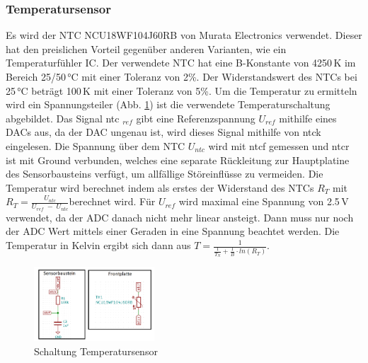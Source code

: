 \subsubsection{Temperatursensor}
Es wird der NTC NCU18WF104J60RB von Murata Electronics verwendet. Dieser hat den preislichen Vorteil gegenüber anderen Varianten, wie ein Temperaturfühler IC. Der verwendete NTC hat eine B-Konstante von 4250\,K im Bereich 25/50\,°C mit einer Toleranz von 2\%. Der Widerstandswert des NTCs bei 25\,°C beträgt 100\,K mit einer Toleranz von 5\%. Um die Temperatur zu ermitteln wird ein Spannungsteiler (Abb. \ref{pic: Temperatursensor}) ist die verwendete Temperaturschaltung abgebildet. Das Signal ntc $_{ref}$ gibt eine Referenzspannung $U_{ref}$ mithilfe eines DACs aus, da der DAC ungenau ist, wird dieses Signal mithilfe von ntck eingelesen. Die Spannung über dem NTC $U_{ntc}$ wird mit ntcf gemessen und ntcr ist mit Ground verbunden, welches eine separate Rückleitung zur Hauptplatine des Sensorbausteins verfügt, um allfällige Störeinflüsse zu vermeiden. Die Temperatur wird berechnet indem als erstes der Widerstand des NTCs $R_T$ mit $R_T = \frac{U_{ntc}}{U_{ref}\;-\;U_{ntc}}$berechnet wird. Für $U_{ref}$ wird maximal eine Spannung von 2.5\,V verwendet, da der ADC danach nicht mehr linear ansteigt. Dann muss nur noch der ADC Wert mittels einer Geraden in eine Spannung beachtet werden. Die Temperatur in Kelvin ergibt sich dann aus $T = \frac{1}{\frac{1}{T_N}+\frac{1}{B} \cdot ln(R_T)}$.
\begin{figure}[h!]
	\centering
	\includegraphics[width=0.4\textwidth]{graphics/shematics_sensor_Temp.png}
	\caption{Schaltung Temperatursensor}
	\label{pic: Temperatursensor}
\end{figure}

